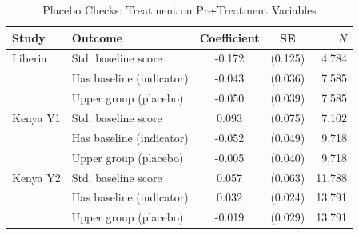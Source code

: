 \begin{table}[htbp]
\centering\small
\caption{Placebo Checks: Treatment on Pre-Treatment Variables}
\label{tab:placebo}
\begin{tabular}{llccr}
\toprule
Study & Outcome & Coefficient & SE & $N$ \\
\midrule
Liberia & Std. baseline score & -0.172 & (0.125) & 4,784 \\
 & Has baseline (indicator) & -0.043 & (0.036) & 7,585 \\
 & Upper group (placebo) & -0.050 & (0.039) & 7,585 \\
\addlinespace
Kenya Y1 & Std. baseline score & 0.093 & (0.075) & 7,102 \\
 & Has baseline (indicator) & -0.052 & (0.049) & 9,718 \\
 & Upper group (placebo) & -0.005 & (0.040) & 9,718 \\
\addlinespace
Kenya Y2 & Std. baseline score & 0.057 & (0.063) & 11,788 \\
 & Has baseline (indicator) & 0.032 & (0.024) & 13,791 \\
 & Upper group (placebo) & -0.019 & (0.029) & 13,791 \\
\bottomrule
\end{tabular}
\par\smallskip{}
\end{table}